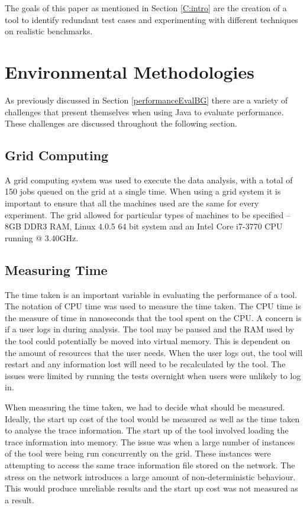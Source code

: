 \documentclass[11pt
              , a4paper
              , twoside
              , openright
              ]{report}
\begin{document}
The goals of this paper as mentioned in Section \ref{C:intro} are the creation of a tool to identify redundant test cases and experimenting with different techniques on realistic benchmarks.

\section{Environmental Methodologies}
\label{enviro}
As previously discussed in Section \ref{performanceEvalBG} there are a variety of challenges that present themselves when using Java to evaluate performance. These challenges are discussed throughout the following section.

\subsection{Grid Computing}
A grid computing system was used to execute the data analysis, with a total of 150 jobs queued on the grid at a single time. When using a grid system it is important to ensure that all the machines used are the same for every experiment. The grid allowed for particular types of machines to be specified -- 8GB DDR3 RAM, Linux 4.0.5 64 bit system and an Intel Core i7-3770 CPU running @ 3.40GHz.

\subsection{Measuring Time }
The time taken is an important variable in evaluating the performance of a tool. The notation of CPU time was used to measure the time taken. The CPU time is the measure of time in nanoseconds that the tool spent on the CPU. A concern is if a user logs in during analysis. The tool may be paused and the RAM used by the tool could potentially be moved into virtual memory. This is dependent on the amount of resources that the user needs. When the user logs out, the tool will restart and any information lost will need to be recalculated by the tool. The issues were limited by running the tests overnight when users were unlikely to log in.

When measuring the time taken, we had to decide what should be measured. Ideally, the start up cost of the tool would be measured as well as the time taken to analyse the trace information. The start up of the tool involved loading the trace information into memory. The issue was when a large number of instances of the tool were being run concurrently on the grid. These instances were attempting to access the same trace information file stored on the network. The stress on the network introduces a large amount of non-deterministic behaviour. This would produce unreliable results and the start up cost was not measured as a result.
\end{document}
